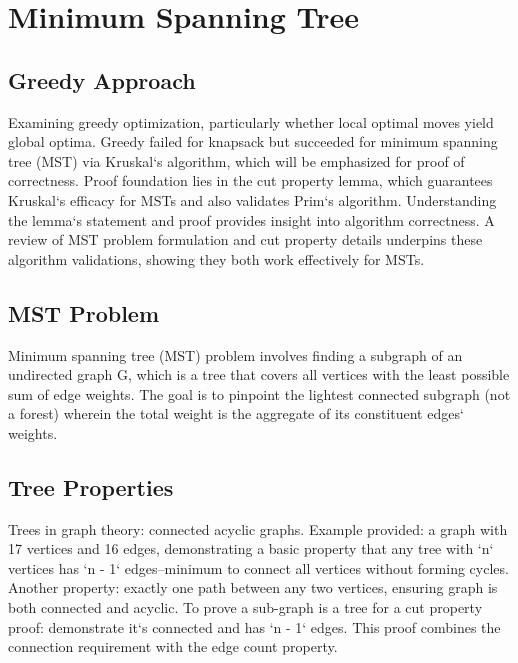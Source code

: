 \section*{Minimum Spanning Tree}

\subsection*{Greedy Approach}
Examining greedy optimization, particularly whether local optimal moves yield global optima.
Greedy failed for knapsack but succeeded for minimum spanning tree (MST) via Kruskal`s algorithm, which will be emphasized for proof of correctness.
Proof foundation lies in the cut property lemma, which guarantees Kruskal`s efficacy for MSTs and also validates Prim`s algorithm.
Understanding the lemma`s statement and proof provides insight into algorithm correctness.
A review of MST problem formulation and cut property details underpins these algorithm validations, showing they both work effectively for MSTs.

\subsection*{MST Problem}
Minimum spanning tree (MST) problem involves finding a subgraph of an undirected graph G, which is a tree that covers all vertices with the least possible sum of edge weights.
The goal is to pinpoint the lightest connected subgraph (not a forest) wherein the total weight is the aggregate of its constituent edges` weights.

\subsection*{Tree Properties}
Trees in graph theory: connected acyclic graphs.
Example provided: a graph with 17 vertices and 16 edges, demonstrating a basic property that any tree with `n` vertices has `n - 1` edges--minimum to connect all vertices without forming cycles.
Another property: exactly one path between any two vertices, ensuring graph is both connected and acyclic.
To prove a sub-graph is a tree for a cut property proof: demonstrate it`s connected and has `n - 1` edges.
This proof combines the connection requirement with the edge count property.

